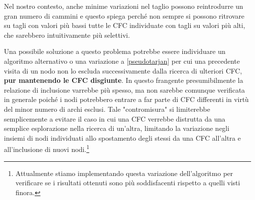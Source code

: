 \documentclass[10pt,a4paper]{article}
\begin{document}
Nel nostro contesto, anche minime variazioni nel taglio possono reintrodurre un gran numero di cammini e questo spiega perché non sempre si possono ritrovare su tagli con valori più bassi tutte le CFC individuate con tagli su valori più alti, che sarebbero intuitivamente più selettivi.

Una possibile soluzione a questo problema potrebbe essere individuare un algoritmo alternativo o una variazione a \ref{pseudotarjan} per cui una precedente visita di un nodo non lo  escluda successivamente dalla ricerca di ulteriori CFC, \textbf{pur mantenendo le CFC disgiunte}. In questo frangente presumibilmente la relazione di inclusione varrebbe più spesso, ma non sarebbe comunque verificata in generale poiché i nodi potrebbero entrare a far parte di CFC differenti in virtù del minor numero di archi esclusi. Tale "contromisura" si limiterebbe semplicemente a evitare il caso in cui una CFC verrebbe distrutta da una semplice esplorazione nella ricerca di un'altra, limitando la variazione negli insiemi di nodi individuati allo spostamento degli stessi da una CFC all'altra e all'inclusione di nuovi nodi.\footnote{Attualmente stiamo implementando questa variazione dell'algoritmo per verificare se i risultati ottenuti sono più soddisfacenti rispetto a quelli visti finora.}
\end{document}
